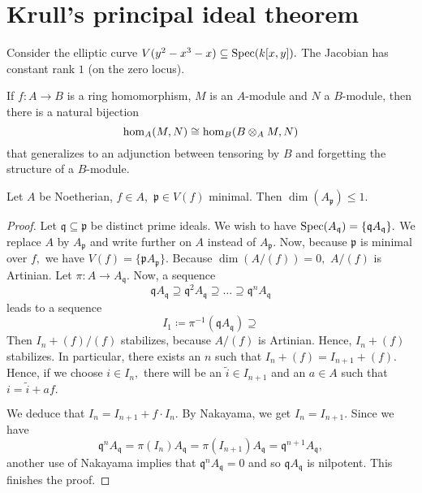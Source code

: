 \section{Krull's principal ideal theorem}

\begin{example}
  Consider the elliptic curve
  \(V(y^2-x^3-x) \subseteq \text{Spec}(k[x, y]).\)
  The Jacobian has constant rank \(1\) (on the zero locus).
\end{example}

\begin{note}
  If \(f \colon A \to B\) is a ring homomorphism, \(M\) is an \(A\)-module and \(N\) a \(B\)-module, then there is a natural bijection
  \[\hom_A(M, N) \cong \hom_B(B \otimes_A M, N)\]
  that generalizes to an adjunction between tensoring by \(B\) and forgetting the structure of a \(B\)-module.
\end{note}

\begin{theorem}
  \label{krull's principal ideal theorem}
  Let \(A\) be Noetherian, \(f \in A,\) \(\mathfrak p \in V(f)\) minimal. Then \(\dim(A_{\mathfrak p}) \leq 1.\)
\end{theorem}
\begin{proof}
  Let \(\mathfrak q \subseteq \mathfrak p\) be distinct prime ideals. We wish to have
  \(\text{Spec}(A_{\mathfrak q}) = \{ \mathfrak q A_{\mathfrak q}\}.\)
  We replace \(A\) by \(A_{\mathfrak p}\) and write further on \(A\) instead of \(A_{\mathfrak p}.\)
  Now, because \(\mathfrak p\) is minimal over \(f,\) we have
  \(V(f) = \{\mathfrak p A_{\mathfrak p}\}.\)
  Because \(\dim(A/{(f)}) = 0,\) \(A/{(f)}\) is Artinian.
  Let \(\pi \colon A \to A_{\mathfrak q}.\) Now, a sequence
  \[\mathfrak q A_{\mathfrak q} \supseteq \mathfrak q^2 A_{\mathfrak q} \supseteq \dotso \supseteq \mathfrak q^n A_{\mathfrak q}\]
  leads to a sequence
  \[I_1 \coloneqq \pi^{-1}(\mathfrak q A_{\mathfrak q}) \supseteq\]
  Then \(I_n+(f)/{(f)}\) stabilizes, because \(A/{(f)}\) is Artinian. Hence, \(I_n + (f)\) stabilizes. In particular, there exists an \(n\) such that \(I_n + (f) = I_{n+1} + (f).\)
  Hence, if we choose \(i \in I_n,\) there will be an \(\tilde{i} \in I_{n+1}\) and an \(a \in A\) such that
  \(i = \tilde{i} + af.\)

  We deduce that \(I_n = I_{n+1} + f \cdot I_n\). By Nakayama,
  we get \(I_n = I_{n+1}.\)
  Since we have
  \[\mathfrak q^n A_{\mathfrak q} = \pi(I_n)A_{\mathfrak q} = \pi(I_{n+1}) A_{\mathfrak q} = \mathfrak q^{n+1} A_{\mathfrak q},\]
  another use of Nakayama implies that \(\mathfrak q^n A_{\mathfrak q} = 0\) and so \(\mathfrak q A_{\mathfrak q}\) is nilpotent.
  This finishes the proof.
\end{proof}

